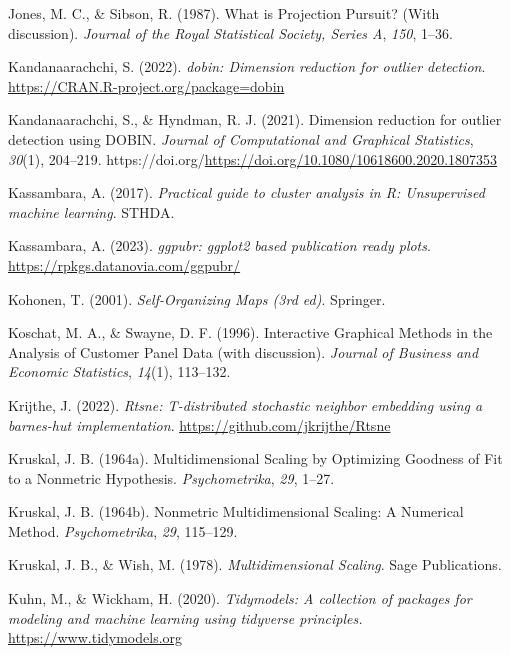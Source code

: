 \documentclass[
  letterpaper,
]{krantz}
\newlength{\cslhangindent}
\newenvironment{CSLReferences}[2] %
 {\begin{list}{}{%
  \setlength{\itemindent}{0pt}
  \setlength{\leftmargin}{0pt}
  \setlength{\parsep}{0pt}
  \ifodd #1
   \setlength{\leftmargin}{\cslhangindent}
   \setlength{\itemindent}{-1\cslhangindent}
  \fi
  \setlength{\itemsep}{#2\baselineskip}}}
 {\end{list}}
\begin{document}
\begin{CSLReferences}{1}{0}
Jones, M. C., \& Sibson, R. (1987). {W}hat is {P}rojection {P}ursuit?
(With discussion). \emph{Journal of the Royal Statistical Society,
Series A}, \emph{150}, 1--36.

Kandanaarachchi, S. (2022). \emph{{dobin}: Dimension reduction for
outlier detection}. \url{https://CRAN.R-project.org/package=dobin}

Kandanaarachchi, S., \& Hyndman, R. J. (2021). Dimension reduction for
outlier detection using DOBIN. \emph{Journal of Computational and
Graphical Statistics}, \emph{30}(1), 204--219.
https://doi.org/\url{https://doi.org/10.1080/10618600.2020.1807353}

Kassambara, A. (2017). \emph{Practical guide to cluster analysis in {R}:
Unsupervised machine learning}. STHDA.

Kassambara, A. (2023). \emph{{ggpubr}: ggplot2 based publication ready
plots}. \url{https://rpkgs.datanovia.com/ggpubr/}

Kohonen, T. (2001). \emph{Self-{O}rganizing {M}aps (3rd ed)}. Springer.

Koschat, M. A., \& Swayne, D. F. (1996). Interactive {G}raphical
{M}ethods in the {A}nalysis of {C}ustomer {P}anel {D}ata (with
discussion). \emph{Journal of Business and Economic Statistics},
\emph{14}(1), 113--132.

Krijthe, J. (2022). \emph{{Rtsne}: T-distributed stochastic neighbor
embedding using a barnes-hut implementation}.
\url{https://github.com/jkrijthe/Rtsne}

Kruskal, J. B. (1964a). Multidimensional {S}caling by {O}ptimizing
{G}oodness of {F}it to a {N}onmetric {H}ypothesis. \emph{Psychometrika},
\emph{29}, 1--27.

Kruskal, J. B. (1964b). Nonmetric {M}ultidimensional {S}caling: A
{N}umerical {M}ethod. \emph{Psychometrika}, \emph{29}, 115--129.

Kruskal, J. B., \& Wish, M. (1978). \emph{Multidimensional {S}caling}.
Sage Publications.

Kuhn, M., \& Wickham, H. (2020). \emph{Tidymodels: A collection of
packages for modeling and machine learning using tidyverse principles.}
\url{https://www.tidymodels.org}


\end{CSLReferences}
\end{document}
